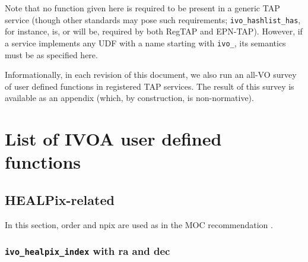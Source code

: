 \documentclass[11pt,a4paper]{ivoa}
\begin{document}
Note that no function given here is required to be present in a generic
TAP service (though other standards may pose such requirements;
\verb|ivo_hashlist_has|, for instance, is, or will be, required by both
RegTAP and EPN-TAP).  However, if a service implements any UDF with a
name starting with \verb|ivo_|, its semantics must be as specified here.

Informationally, in each revision of this document, we also run an
all-VO survey of user defined functions in registered TAP services.  The
result of this survey is available as an appendix (which, by
construction, is non-normative).







\section{List of IVOA user defined functions}
\subsection{HEALPix-related}

In this section, order and npix are used as in the MOC recommendation
\citep{2014ivoa.spec.0602F}.

\subsubsection{\texttt{ivo\_healpix\_index} with ra and dec}
\end{document}
